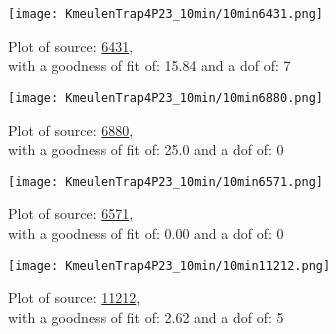 \documentclass{article}
\begin{document}
\begin{figure}[H]
    \centering
    \begin{minipage}{.5\textwidth}
        \centering
        \texttt{[image: KmeulenTrap4P23\_10min/10min6431.png]}
        \captionsetup{labelformat=empty}
        \caption{Plot of source: \href{http://banana.transientskp.org/r4/vlo_KmeulenTrap4P23/runningcatalog/6431}{6431},\\with a goodness of fit of: 15.84 and a dof of: 7}
        \addtocounter{figure}{-1}
        \label{KmeulenTrap4P23:10min:6431:plot}
    \end{minipage}%
    \begin{minipage}{0.5\textwidth}
        \centering

        \texttt{[image: KmeulenTrap4P23\_10min/10min6880.png]}
        \captionsetup{labelformat=empty}
        \caption{Plot of source: \href{http://banana.transientskp.org/r4/vlo_KmeulenTrap4P23/runningcatalog/6880}{6880},\\with a goodness of fit of: 25.0 and a dof of: 0}
    \addtocounter{figure}{-1}
    \label{KmeulenTrap4P23:10min:6880:plot}
    \end{minipage}
\end{figure}
\begin{figure}[H]
    \centering
    \begin{minipage}{.5\textwidth}
        \centering
        \texttt{[image: KmeulenTrap4P23\_10min/10min6571.png]}
        \captionsetup{labelformat=empty}
        \caption{Plot of source: \href{http://banana.transientskp.org/r4/vlo_KmeulenTrap4P23/runningcatalog/6571}{6571},\\with a goodness of fit of: 0.00 and a dof of: 0}
        \addtocounter{figure}{-1}
        \label{KmeulenTrap4P23:10min:6571:plot}
    \end{minipage}%
    \begin{minipage}{0.5\textwidth}
        \centering

        \texttt{[image: KmeulenTrap4P23\_10min/10min11212.png]}
        \captionsetup{labelformat=empty}
        \caption{Plot of source: \href{http://banana.transientskp.org/r4/vlo_KmeulenTrap4P23/runningcatalog/11212}{11212},\\with a goodness of fit of: 2.62 and a dof of: 5}
    \addtocounter{figure}{-1}
    \label{KmeulenTrap4P23:10min:11212:plot}
    \end{minipage}
\end{figure}
\newpage
\end{document}
